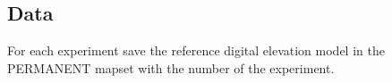 \documentclass[prodmode,acmtochi]{acmsmall} %
\begin{document}
\subsection{Data}
%
For each experiment 
save the reference digital elevation model
in the PERMANENT mapset 
with the number of the experiment.

\end{document}
